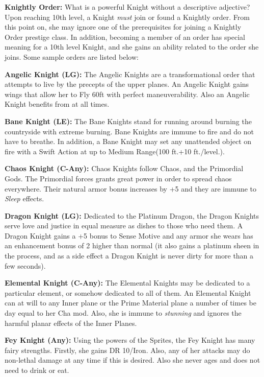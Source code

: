 \textbf{Knightly Order:} What is a powerful Knight without a descriptive adjective? Upon reaching 10th level, a Knight \textit{must} join or found a Knightly order. From this point on, she may ignore one of the prerequisites for joining a Knightly Order prestige class. In addition, becoming a member of an order has special meaning for a 10th level Knight, and she gains an ability related to the order she joins. Some sample orders are listed below:

\begin{itemize*}
\item \textbf{Angelic Knight (LG):} The Angelic Knights are a transformational order that attempts to live by the precepts of the upper planes. An Angelic Knight gains wings that allow her to Fly 60ft with perfect maneuverability. Also an Angelic Knight benefits from  at all times.
\item \textbf{Bane Knight (LE):}  The Bane Knights stand for running around burning the countryside with extreme burning. Bane Knights are immune to fire and do not have to breathe. In addition, a Bane Knight may set any unattended object on fire with a Swift Action at up to Medium Range(100 ft.+10 ft./level.).
\item \textbf{Chaos Knight (C-Any):}  Chaos Knights follow Chaos, and the Primordial Gods. The Primordial forces grants great power in order to spread chaos everywhere. Their natural armor bonus increases by +5 and they are immune to \textit{Sleep} effects.
\item \textbf{Dragon Knight (LG):}  Dedicated to the Platinum Dragon, the Dragon Knights serve love and justice in equal measure as dishes to those who need them. A Dragon Knight gains a +5 bonus to Sense Motive and any armor she wears has an enhancement bonus of 2 higher than normal (it also gains a platinum sheen in the process, and as a side effect a Dragon Knight is never dirty for more than a few seconds).
\item \textbf{Elemental Knight (C-Any):}  The Elemental Knights may be dedicated to a particular element, or somehow dedicated to all of them. An Elemental Knight can  at will to any Inner plane or the Prime Material plane a number of times be day equal to her Cha mod. Also, she is immune to \textit{stunning} and ignores the harmful planar effects of the Inner Planes.
\item \textbf{Fey Knight (Any):}  Using the powers of the Sprites, the Fey Knight has many fairy strengths. Firstly, she gains DR 10/Iron. Also, any of her attacks may do non-lethal damage at any time if this is desired. Also she never ages and does not need to drink or eat.

\end{itemize*}
